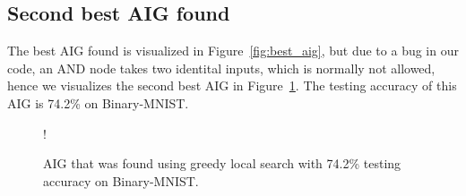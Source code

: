 \subsection{Second best AIG found} \label{app:aig-mnist}
The best AIG found is visualized in Figure~\ref{fig:best_aig}, but due to a bug in our code, an AND node takes two identital inputs, which is normally not allowed, hence we visualizes the second best AIG in Figure~\ref{fig:aig-mnist}. The testing accuracy of this AIG is 74.2\% on Binary-MNIST.

\begin{figure}[!htb]
    \centering
    \resizebox {0.45\textwidth} {!} {
      
    }
      \caption{AIG that was found using greedy local search with 74.2\% testing accuracy on Binary-MNIST.}
\label{fig:aig-mnist}
\end{figure}
\FloatBarrier
